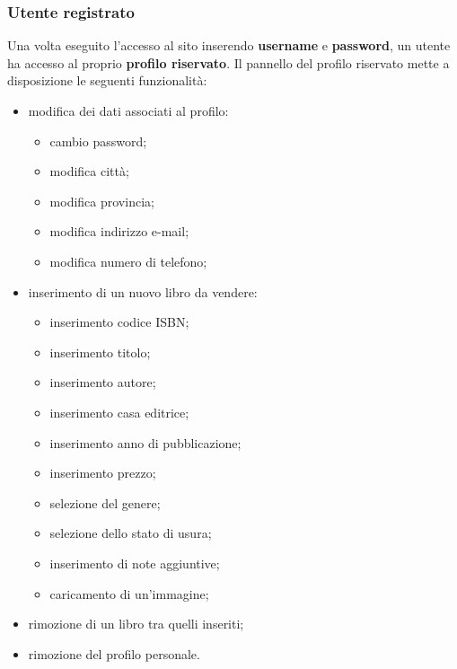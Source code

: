 \documentclass[openany,10pt,a4paper]{article}
\begin{document}
		\subsubsection{Utente registrato}
		Una volta eseguito l'accesso al sito inserendo \textbf{username} e \textbf{password}, un utente ha accesso al proprio \textbf{profilo riservato}. Il pannello del profilo riservato mette a disposizione le 
		seguenti funzionalità:
				\begin{itemize}
					\item modifica dei dati associati al profilo:
						\begin{itemize}
							\item cambio password;
							\item modifica città;
							\item modifica provincia;
							\item modifica indirizzo e-mail;
							\item modifica numero di telefono;
						\end{itemize}
					\item inserimento di un nuovo libro da vendere:
						\begin{itemize}
							\item inserimento codice ISBN;
							\item inserimento titolo;
							\item inserimento autore;
							\item inserimento casa editrice;
							\item inserimento anno di pubblicazione;
							\item inserimento prezzo;
							\item selezione del genere;
							\item selezione dello stato di usura;
							\item inserimento di note aggiuntive;
							\item caricamento di un'immagine;
						\end{itemize}
					\item rimozione di un libro tra quelli inseriti;
					\item rimozione del profilo personale.
				\end{itemize}
\end{document}
